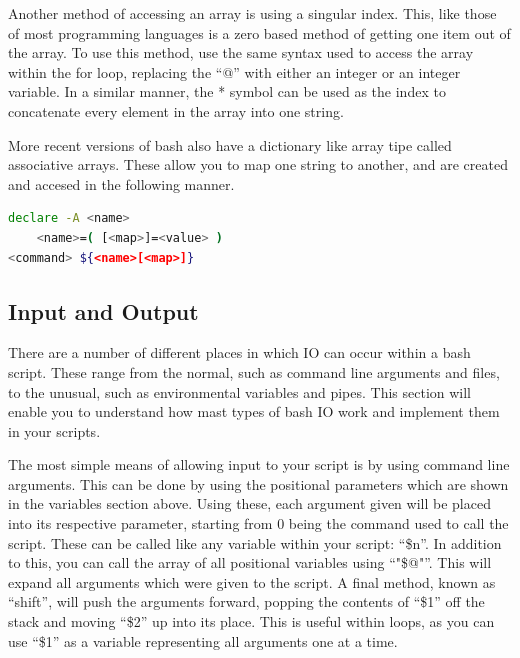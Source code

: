 \documentclass[a4paper,11pt]{report}
\begin{document}
			Another method of accessing an array is using a singular index. 
			This, like those of most programming languages is a zero based method of getting one item out of the array. 
			To use this method, use the same syntax used to access the array within the for loop, replacing the ``@'' with either an integer or an integer variable. 
			In a similar manner, the \** symbol can be used as the index to concatenate every element in the array into one string. 

			More recent versions of bash also have a dictionary like array tipe called associative arrays. 
			These allow you to map one string to another, and are created and accesed in the following manner. 
			\begin{lstlisting}[language=bash,numbers=none]
declare -A <name>
	<name>=( [<map>]=<value> )
<command> ${<name>[<map>]}
			\end{lstlisting}

		\subsection{Input and Output}
			There are a number of different places in which IO can occur within a bash script. 
			These range from the normal, such as command line arguments and files, to the unusual, such as environmental variables and pipes. 
			This section will enable you to understand how mast types of bash IO work and implement them in your scripts. 

			The most simple means of allowing input to your script is by using command line arguments. 
			This can be done by using the positional parameters which are shown in the variables section above. 
			Using these, each argument given will be placed into its respective parameter, starting from 0 being the command used to call the script. 
			These can be called like any variable within your script: ``\$n''.
			In addition to this, you can call the array of all positional variables using ``"\$@"''. 
			This will expand all arguments which were given to the script. 
			A final method, known as ``shift'', will push the arguments forward, popping the contents of ``\$1'' off the stack and moving ``\$2'' up into its place. 
			This is useful within loops, as you can use ``\$1'' as a variable representing all arguments one at a time. 
\end{document}
